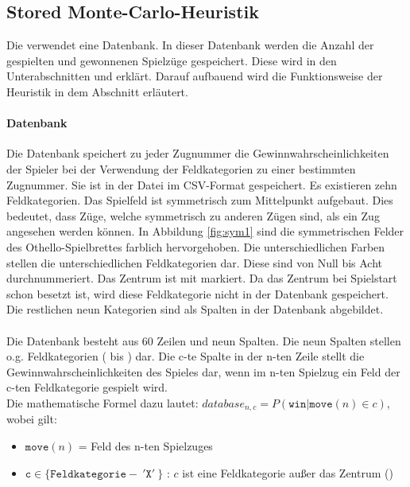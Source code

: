 \subsection{Stored Monte-Carlo-Heuristik}
\label{impl:stored-mc}
Die  verwendet eine Datenbank. In dieser Datenbank werden die Anzahl der gespielten und gewonnenen Spielzüge gespeichert. Diese wird in den Unterabschnitten  und  erklärt. Darauf aufbauend wird die Funktionsweise der Heuristik in dem Abschnitt  erläutert.
\paragraph{Datenbank}
\label{para:db}
Die Datenbank speichert zu jeder Zugnummer die Gewinnwahrscheinlichkeiten der Spieler bei der Verwendung der Feldkategorien zu einer bestimmten Zugnummer. Sie ist in der Datei  im CSV-Format gespeichert. Es existieren zehn Feldkategorien. 
Das Spielfeld ist symmetrisch zum Mittelpunkt aufgebaut. Dies bedeutet, dass Züge, welche symmetrisch zu anderen Zügen sind, als ein Zug angesehen werden können. In Abbildung \ref{fig:sym1} sind die symmetrischen Felder des Othello-Spielbrettes farblich hervorgehoben. Die unterschiedlichen Farben stellen die unterschiedlichen Feldkategorien dar. Diese sind von Null bis Acht durchnummeriert. Das Zentrum ist mit  markiert. Da das Zentrum bei Spielstart schon besetzt ist, wird diese Feldkategorie nicht in der Datenbank gespeichert. Die restlichen neun Kategorien sind als Spalten in der Datenbank abgebildet.
\\
\\Die Datenbank besteht aus 60 Zeilen und neun Spalten. Die neun Spalten stellen o.g. Feldkategorien ( bis ) dar. Die c-te Spalte in der n-ten Zeile stellt die Gewinnwahrscheinlichkeiten des Spieles dar, wenn im n-ten Spielzug ein Feld der c-ten Feldkategorie gespielt wird. 
\\Die mathematische Formel dazu lautet:
$database_{n,c} = P( \mathtt{win} | \mathtt{move}(n) \in c)$, wobei gilt:
\begin{itemize}
\item $\mathtt{move}(n)$ = Feld des n-ten Spielzuges
\item $\mathtt{c} \in \{\mathtt{Feldkategorie} -\ '\mathtt{X}'\ \}$ : $c$ ist eine Feldkategorie außer das Zentrum ()
\end{itemize}
